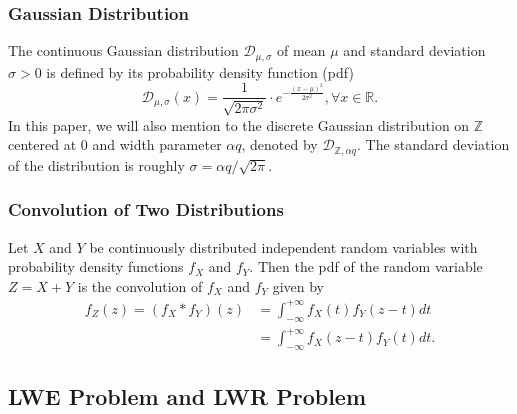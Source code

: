 \documentclass{cta-author}
\begin{document}
\subsubsection{Gaussian Distribution} The continuous Gaussian distribution $\mathcal{D}_{\mu, \sigma}$ of mean $\mu$ and standard deviation $\sigma>0$ is defined by its probability density function (pdf)
$$\mathcal{D}_{\mu, \sigma}(x)=\frac{1}{\sqrt{2\pi \sigma^2}} \cdot e^{-\frac{(x-\mu)^2}{2\sigma^2}}, \forall x \in \mathbb{R}.$$ 
In this paper, we will also mention to the discrete Gaussian distribution on $\mathbb{Z}$ centered at $0$ and width parameter $\alpha q$, denoted by  $\mathcal{D}_{\mathbb{Z},\alpha q}$.
The standard deviation of the distribution is roughly  $\sigma=\alpha q/\sqrt{2\pi}$.
\subsubsection{Convolution of Two Distributions} Let $X$ and $Y$ be continuously distributed independent random variables with probability density functions $f_X$ and $f_Y$. Then the pdf of the random variable $Z=X+Y$ is the convolution of $f_X$ and $f_Y$ given by
\begin{equation}\label{keycon}
\begin{split}
f_Z(z)=(f_X*f_Y)(z)&=\int_{-\infty}^{+\infty}f_X(t)f_Y(z-t)dt\\
&=\int_{-\infty}^{+\infty}f_X(z-t)f_Y(t)dt.
\end{split}
\end{equation}

\subsection{ LWE Problem and LWR Problem}  \label{lwer}
\end{document}
